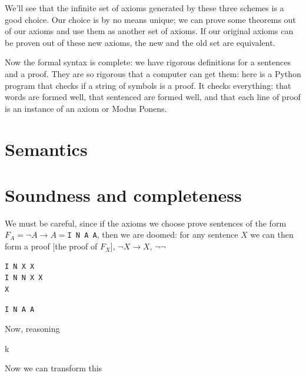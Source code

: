\documentclass[11pt,oneside,%
]{memoir}
\theoremstyle{definition}
\newcommand{\propositio}{\lstinline[language=propositio]}
\begin{document}
We'll see that the infinite set of axioms generated by these three schemes is a good choice. Our choice is by no means unique; we can prove some theorems out of our axioms and use them as another set of axioms. If our original axioms can be proven out of these new axioms, the new and the old set are equivalent.

%

Now the formal syntax is complete: we have rigorous definitions for a sentences and a proof. They are so rigorous that a computer can get them: here is a Python program that checks if a string of symbols is a proof. It checks everything: that words are formed well, that sentenced are formed well, and that each line of proof is an instance of an axiom or Modus Ponens.












\section{Semantics}

\section{Soundness and completeness}




We must be careful, since if the axioms we choose prove sentences of the form \(F_A=\neg A\rightarrow A=\)\propositio!I N A A!, then we are doomed: for any sentence \(X\) we can then form a proof [the proof of \(F_X\)], \(\neg X\rightarrow X\), \(\neg\neg\)
\begin{lstlisting}[language=propositio]
I N X X
I N N X X
X
\end{lstlisting}
\propositio!I N A A!




Now, reasoning 


k

Now we can transform this 









\end{document}
